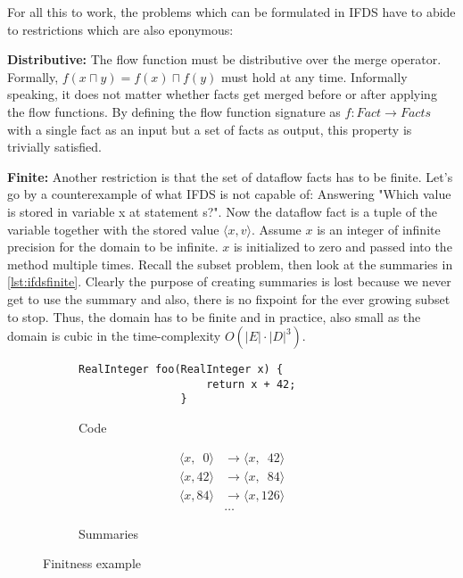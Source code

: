 \documentclass[../draft.tex]{subfiles}
\begin{document}
    For all this to work, the problems which can be formulated in IFDS have to abide to restrictions which are also eponymous:

    \textbf{Distributive:} The flow function must be distributive over the merge operator. Formally, $f(x \sqcap y) = f(x) \sqcap f(y)$ must hold at any time. Informally speaking, it does not matter whether facts get merged before or after applying the flow functions. By defining the flow function signature as $f: \mathit{Fact} \rightarrow \mathit{Facts}$ with a single fact as an input but a set of facts as output, this property is trivially satisfied.

    \textbf{Finite:} Another restriction is that the set of dataflow facts has to be finite. Let's go by a counterexample of what IFDS is not capable of: Answering "Which value is stored in variable x at statement s?".
    Now the dataflow fact is a tuple of the variable together with the stored value $\langle x, v \rangle$. Assume $x$ is an integer of infinite precision for the domain to be infinite.
    $x$ is initialized to zero and passed into the method  multiple times. Recall the subset problem, then look at the summaries in \autoref{lst:ifdsfinite}. Clearly the purpose of creating summaries is lost because we never get to use the summary and also, there is no fixpoint for the ever growing subset to stop. Thus, the domain has to be finite and in practice, also small as the domain is cubic in the time-complexity $O(|E| \cdot |D|^3)$.
    \begin{figure}[ht]
        \centering
        \begin{subfigure}[b]{0.45\textwidth}
            \begin{lstlisting}[gobble=16]
                RealInteger foo(RealInteger x) {
                    return x + 42;
                }
            \end{lstlisting}
            \caption{Code}
        \end{subfigure}
        \begin{subfigure}[b]{0.45\textwidth}
            $$
                \begin{aligned}
                    \langle x, \phantom{0}0 \rangle &\rightarrow \langle x, \phantom{1}42 \rangle\\
                    \langle x, 42 \rangle &\rightarrow \langle x, \phantom{1}84 \rangle\\
                    \langle x, 84 \rangle &\rightarrow \langle x, 126 \rangle\\
                    &\dots
                \end{aligned}
            $$
            \caption{Summaries}
        \end{subfigure}
        \caption{Finitness example}
        \label{lst:ifdsfinite}
    \end{figure}
\end{document}
